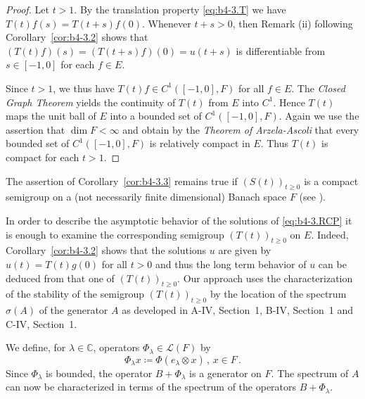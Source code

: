 \begin{proof} 
Let $t > 1$. 
By the translation property \eqref{eq:b4-3.T} we have $T(t)f(s) = T(t+s)f(0)$. Whenever $t + s > 0$, then Remark (ii) following Corollary~\ref{cor:b4-3.2} shows that $(T(t)f)(s) = (T(t+s)f)(0) = u(t+s)$ is differentiable from $s \in [-1,0]$ for each $f \in E$.

Since $t > 1$, we thus have $T(t)f \in C^1([-1,0],F)$ for all $f \in E$. 
The \emph{Closed Graph Theorem} yields the continuity of $T(t)$ from $E$ into $C^1$. 
Hence $T(t)$ maps the unit ball of $E$ into a bounded set of $C^1([-1,0],F)$. 
Again we use the assertion that $\dim F < \infty$ and obtain by the \emph{Theorem of Arzela-Ascoli} that every bounded set of $C^1([-1,0],F)$ is relatively compact in $E$. 
Thus $T(t)$ is compact for each $t > 1$.
\end{proof}
The assertion of Corollary~\ref{cor:b4-3.3} remains true if $(S(t))_{t \geq 0}$ is a compact semigroup on a (not necessarily finite dimensional) Banach space $F$ (see \citet{traviswebb:1974}).

In order to describe the asymptotic behavior of the solutions of \eqref{eq:b4-3.RCP} it is enough to examine the corresponding semigroup $(T(t))_{t \geq 0}$ on $E$. 
Indeed, Corollary~\ref{cor:b4-3.2} shows that the solutions $u$ are given by $u(t) = T(t)g(0)$ for all $t > 0$ and thus the long term behavior of $u$ can be deduced from that one of $(T(t))_{t \geq 0}$. 
Our approach uses the characterization of the stability of the semigroup $(T(t))_{t \geq 0}$ by the location of the spectrum $\sigma(A)$ of the generator $A$ as developed in A-IV, Section~1, B-IV, Section~1 and C-IV, Section~1.

We define, for $\lambda \in \mathbb{C}$, operators $\Phi_\lambda \in \mathcal{L}(F)$ by
\begin{equation}\label{eq:b4-3.3}
	\Phi_\lambda x  \coloneq  \Phi(e_\lambda \otimes x) \, , \, x \in F \, .
\end{equation}
Since $\Phi_\lambda$ is bounded, the operator $B + \Phi_\lambda$ is a generator on $F$. 
The spectrum of $A$ can now be characterized in terms of the spectrum of the operators $B + \Phi_\lambda$.


